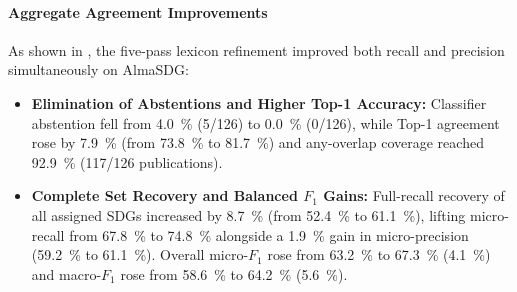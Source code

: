 \paragraph{Aggregate Agreement Improvements}
As shown in , the five-pass lexicon refinement improved both recall and precision simultaneously on AlmaSDG:
\begin{itemize}
  \item \textbf{Elimination of Abstentions and Higher Top-1 Accuracy:} Classifier abstention fell from \qty{4.0}{\percent} (\num{5}/\num{126}) to \qty{0.0}{\percent} (\num{0}/\num{126}), while Top-1 agreement rose by \qty{+7.9}{\percent} (from \qty{73.8}{\percent} to \qty{81.7}{\percent}) and any-overlap coverage reached \qty{92.9}{\percent} (\num{117}/\num{126} publications).
  \item \textbf{Complete Set Recovery and Balanced $F_1$ Gains:} Full-recall recovery of all assigned \glspl{SDG} increased by \qty{+8.7}{\percent} (from \qty{52.4}{\percent} to \qty{61.1}{\percent}), lifting micro-recall from \qty{67.8}{\percent} to \qty{74.8}{\percent} alongside a \qty{+1.9}{\percent} gain in micro-precision (\qty{59.2}{\percent} to \qty{61.1}{\percent}). Overall micro-$F_1$ rose from \qty{63.2}{\percent} to \qty{67.3}{\percent} (\qty{+4.1}{\percent}) and macro-$F_1$ rose from \qty{58.6}{\percent} to \qty{64.2}{\percent} (\qty{+5.6}{\percent}).
\end{itemize}

